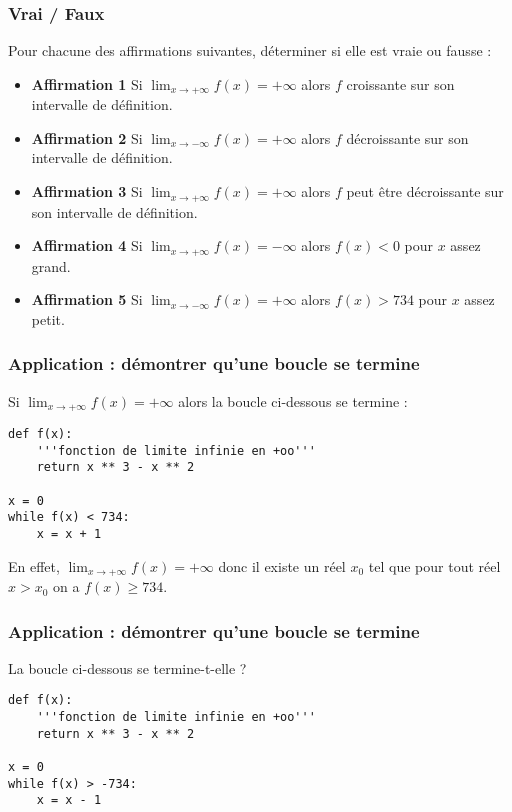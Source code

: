 \documentclass[xcolor=svgnames,t,final]{beamer}
\begin{document}
\begin{frame}

\frametitle{Vrai / Faux}

Pour chacune des affirmations suivantes, déterminer si elle est vraie ou fausse :

\begin{itemize}
\pause \item \textbf{Affirmation 1} Si $\lim_{x \to +\infty}{f(x)}=+\infty$ alors $f$ croissante sur son intervalle de définition.
\pause \item \textbf{Affirmation 2} Si $\lim_{x \to -\infty}{f(x)}=+\infty$ alors $f$ décroissante sur son intervalle de définition.
\pause \item \textbf{Affirmation 3} Si $\lim_{x \to +\infty}{f(x)}=+\infty$ alors $f$ peut être décroissante sur son intervalle de définition.
\pause \item \textbf{Affirmation 4} Si $\lim_{x \to +\infty}{f(x)}=-\infty$ alors $f(x)<0$ pour $x$ assez grand.
\pause \item \textbf{Affirmation 5} Si $\lim_{x \to -\infty}{f(x)}=+\infty$ alors $f(x)>734$ pour $x$ assez petit.
\end{itemize}


\end{frame}



\begin{frame}[fragile]
\frametitle{Application  : démontrer qu'une boucle se termine}
\pause \begin{alertblock}{}
Si $\lim_{x \to +\infty}{f(x)}=+\infty$ alors la boucle ci-dessous se termine :

\medskip

\begin{lstlisting}[style=rond]
def f(x):
	'''fonction de limite infinie en +oo'''
	return x ** 3 - x ** 2  
	
x = 0
while f(x) < 734:
	x = x + 1
\end{lstlisting}

\end{alertblock}

\pause En effet,  $\lim_{x \to +\infty}{f(x)}=+\infty$ donc il existe un réel $x_{0}$ tel que pour tout réel $x >x_{0}$ on a $f(x)\geqslant 734$.

\end{frame}


\begin{frame}[fragile]
\frametitle{Application  : démontrer qu'une boucle se termine}
 \begin{alertblock}{}
La boucle ci-dessous se termine-t-elle ?

\medskip

\begin{lstlisting}[style=rond]
def f(x):
	'''fonction de limite infinie en +oo'''
	return x ** 3 - x ** 2  
	
x = 0
while f(x) > -734:
	x = x - 1
\end{lstlisting}

\end{alertblock}

\end{frame}
\end{document}
